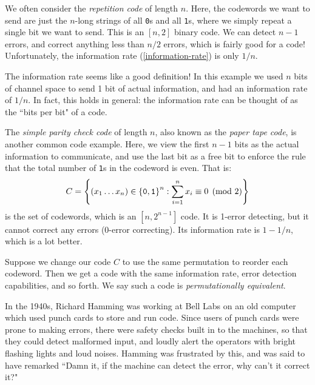 \documentclass{article}
\begin{document}
We often consider the \textit{repetition code} of length $n$.
Here, the codewords we want to send are just
the $n$-long strings of all \texttt{0}s and all \texttt{1}s,
where we simply repeat a single bit we want to send.
This is an $[n, 2]$ binary code.
We can detect $n-1$ errors,
and correct anything less than $n/2$ errors,
which is fairly good for a code!
Unfortunately, the information rate (\ref{information-rate}) is only $1/n$.

\begin{note}
	The information rate seems like a good definition!
	In this example we used $n$ bits of channel space
	to send 1 bit of actual information,
	and had an information rate of $1/n$.
	In fact, this holds in general:
	the information rate can be thought of as the ``bits per bit" of a code.
\end{note}

\begin{example}
    The \textit{simple parity check code} of length $n$,
    also known as the \textit{paper tape code},
    is another common code example.
    Here, we view the first $n-1$ bits as the actual information to communicate,
    and use the last bit as a free bit to enforce the rule that
    the total number of \texttt{1}s in the codeword is even. That is:
    \[
	C = \left\lbrace (x_1 \dots x_n) \in \left\lbrace \texttt{0}, \texttt{1} \right\rbrace^n : \sum_{i=1}^n x_i \equiv 0 \pmod 2 \right\rbrace
	\]
	is the set of codewords, which is an $[n, 2^{n-1}]$ code.
	It is 1-error detecting,
	but it cannot correct any errors (0-error correcting).
	Its information rate is $1 - 1/n$, which is a lot better.
\end{example}

\begin{note}
	Suppose we change our code $C$
	to use the same permutation to reorder each codeword.
	Then we get a code with the same information rate,
	error detection capabilities, and so forth.
	We say such a code is \textit{permutationally equivalent}.
\end{note}

In the 1940s, Richard Hamming was working at Bell Labs on an old computer which used punch cards to store and run code. Since users of punch cards were prone to making errors, there were safety checks built in to the machines, so that they could detect malformed input, and loudly alert the operators with bright flashing lights and loud noises. Hamming was frustrated by this, and was said to have remarked ``Damn it, if the machine can detect the error, why can't it correct it?"
\end{document}
